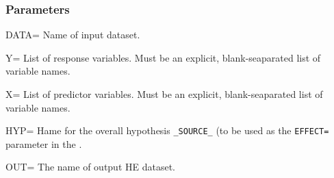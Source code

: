 \subsubsection*{Parameters}
\begin{proglist}

\item[DATA=] Name of input dataset. 

\item[Y=] List of response variables.  Must be an explicit,
blank-seaparated list of variable names.

\item[X=] List of predictor variables.  Must be an explicit,
blank-seaparated list of variable names.

\item[HYP=] Hame for the overall hypothesis \verb|_SOURCE_| (to be used as the \texttt{EFFECT=}
parameter in the .  

\item[OUT=] The name of output HE dataset. 

\end{proglist}
